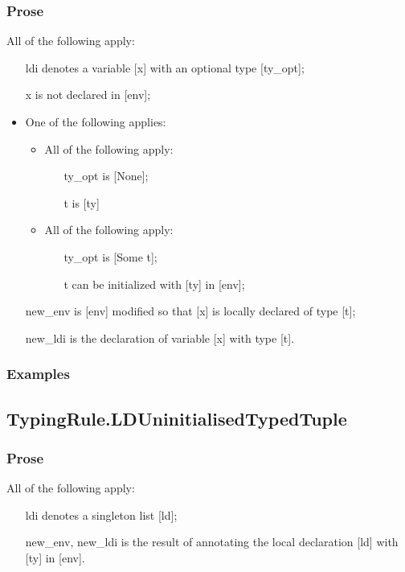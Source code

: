 \documentclass{book}
\begin{document}
    \subsubsection{Prose}
    All of the following apply:
   \begin{itemize}
   \item [ldi] denotes a variable [x] with an optional type [ty\_opt];
   \item [x] is not declared in [env];
   \item One of the following applies:
     \begin{itemize}
     \item All of the following apply:
       \begin{itemize}
       \item [ty\_opt] is [None];
       \item [t] is [ty]
       \end{itemize}
     \item All of the following apply:
       \begin{itemize}
       \item [ty\_opt] is [Some t];
       \item [t] can be initialized with [ty] in [env];
       \end{itemize}
     \end{itemize}
   \item [new\_env] is [env] modified so that [x] is locally declared of type [t];
   \item [new\_ldi] is the declaration of variable [x] with type [t].
   \end{itemize}

    \subsubsection{Examples}

\subsection{TypingRule.LDUninitialisedTypedTuple}

    \subsubsection{Prose}
    All of the following apply:
   \begin{itemize}
   \item [ldi] denotes a singleton list [ld];
   \item [new\_env, new\_ldi] is the result of annotating the local declaration [ld] with [ty] in [env].
   \end{itemize}
\end{document}
